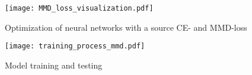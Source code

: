 \begin{figure}[H]
  \centering
  \texttt{[image: MMD\_loss\_visualization.pdf]}
  \caption {Optimization of neural networks with a source CE- and MMD-loss} \label{fig:MMD_Loss_and_CE_loss}
\end{figure}

\begin{figure}[H]
  \centering
  \texttt{[image: training\_process\_mmd.pdf]}
  \caption {Model training and testing} \label{fig:Training_Process_MMD}
\end{figure}


